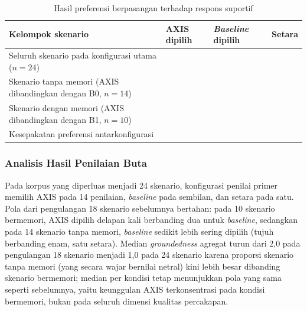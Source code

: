 \begin{table}[!htbp]
\centering
\caption{Hasil preferensi berpasangan terhadap respons suportif}
\label{tab:v2_dialogue_preference}

\renewcommand{\arraystretch}{1.25}
{\footnotesize
\begin{tabularx}{\textwidth}{
    |>{\raggedright\arraybackslash}X
    |>{\centering\arraybackslash}p{1.9cm}
    |>{\centering\arraybackslash}p{1.9cm}
    |>{\centering\arraybackslash}p{1.5cm}|
}
\hline

\rowcolor{tableheadgray}
\textbf{Kelompok skenario}
&
\textbf{AXIS dipilih}
&
\textbf{\textit{Baseline} dipilih}
&
\textbf{Setara}
\\
\hline

Seluruh skenario pada konfigurasi utama
(\(n = 24\))
&
14
&
9
&
1
\\
\hline

Skenario tanpa memori
(AXIS dibandingkan dengan B0, \(n = 14\))
&
6
&
7
&
1
\\
\hline

Skenario dengan memori
(AXIS dibandingkan dengan B1, \(n = 10\))
&
8
&
2
&
0
\\
\hline

Kesepakatan preferensi antarkonfigurasi
&
\multicolumn{3}{c|}{
    Cohen's \(\kappa = -0{,}035\), \(n = 24\)
}
\\
\hline

\end{tabularx}
}
\end{table}

\subsubsection{Analisis Hasil Penilaian Buta}

Pada korpus yang diperluas menjadi 24 skenario, konfigurasi penilai primer memilih AXIS pada 14 penilaian, \textit{baseline} pada sembilan, dan setara pada satu. Pola dari pengulangan 18 skenario sebelumnya bertahan: pada 10 skenario bermemori, AXIS dipilih delapan kali berbanding dua untuk \textit{baseline}, sedangkan pada 14 skenario tanpa memori, \textit{baseline} sedikit lebih sering dipilih (tujuh berbanding enam, satu setara). Median \textit{groundedness} agregat turun dari 2,0 pada pengulangan 18 skenario menjadi 1,0 pada 24 skenario karena proporsi skenario tanpa memori (yang secara wajar bernilai netral) kini lebih besar dibanding skenario bermemori; median per kondisi tetap menunjukkan pola yang sama seperti sebelumnya, yaitu keunggulan AXIS terkonsentrasi pada kondisi bermemori, bukan pada seluruh dimensi kualitas percakapan.

